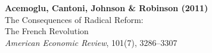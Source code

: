 \documentclass[12pt]{article}
\begin{document}
\begin{center}
{\Large\bfseries Acemoglu, Cantoni, Johnson \& Robinson (2011)}\\
{\large The Consequences of Radical Reform:}\\
{\large The French Revolution}\\
\vspace{0.5em}
{\normalsize \textit{American Economic Review}, 101(7), 3286--3307}
\end{center}

\vspace{1em}




\end{document}
